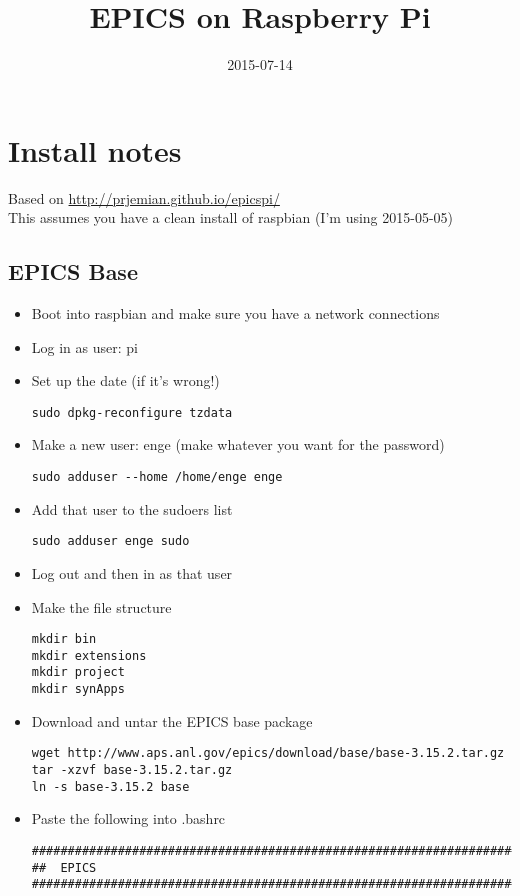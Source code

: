 \documentclass[11pt]{article}
\date{2015-07-14}
\title{EPICS on Raspberry Pi}
\begin{document}
\maketitle

\section{Install notes}
\label{sec-1}
Based on \url{http://prjemian.github.io/epicspi/}\\
  This assumes you have a clean install of raspbian (I'm using 2015-05-05)

\subsection{EPICS Base}
\label{sec-1-1}
\begin{itemize}
\item Boot into raspbian and make sure you have a network connections
\item Log in as user: pi
\item Set up the date (if it's wrong!)
\begin{verbatim}
sudo dpkg-reconfigure tzdata
\end{verbatim}
\item Make a new user: enge (make whatever you want for the password)
\begin{verbatim}
sudo adduser --home /home/enge enge
\end{verbatim}
\item Add that user to the sudoers list
\begin{verbatim}
sudo adduser enge sudo
\end{verbatim}
\item Log out and then in as that user
\item Make the file structure
\begin{verbatim}
mkdir bin
mkdir extensions
mkdir project
mkdir synApps
\end{verbatim}
\item Download and untar the EPICS base package
\begin{verbatim}
wget http://www.aps.anl.gov/epics/download/base/base-3.15.2.tar.gz 
tar -xzvf base-3.15.2.tar.gz
ln -s base-3.15.2 base
\end{verbatim}
\item Paste the following into .bashrc
\begin{verbatim}
######################################################################
##  EPICS
######################################################################


\end{verbatim}
\end{itemize}
\end{document}

